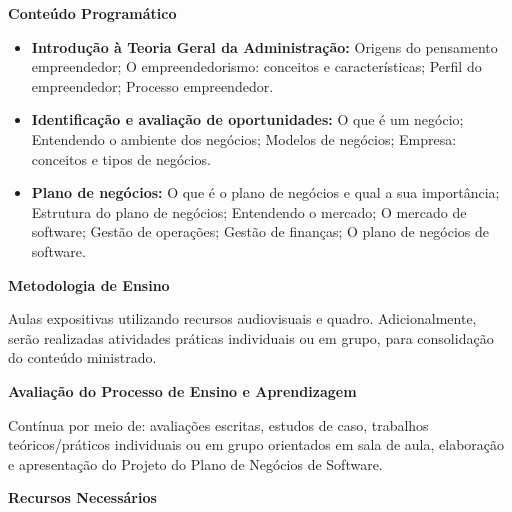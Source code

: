 
\begin{snugshade}\begin{center}\textbf{
    Conteúdo Programático
}\end{center}\end{snugshade}

\begin{itemize}

\item \textbf{Introdução à Teoria Geral da Administração:}
Origens do pensamento empreendedor; O empreendedorismo: conceitos e características; Perfil do empreendedor; Processo empreendedor.

\item \textbf{Identificação e avaliação de oportunidades:}
O que é um negócio; Entendendo o ambiente dos negócios; Modelos de negócios; Empresa: conceitos e tipos de negócios.

\item \textbf{Plano de negócios:} 
O que é o plano de negócios e qual a sua importância; Estrutura do plano de negócios; Entendendo o mercado; O mercado de software; Gestão de operações; Gestão de finanças; O plano de negócios de software.

\end{itemize}


\begin{snugshade}\begin{center}\textbf{
    Metodologia de Ensino
}\end{center}\end{snugshade}

\noindent
Aulas expositivas utilizando recursos audiovisuais e quadro. Adicionalmente, serão realizadas atividades práticas individuais ou em grupo, para consolidação do conteúdo ministrado.

\begin{snugshade}\begin{center}\textbf{
    Avaliação do Processo de Ensino e Aprendizagem
}\end{center}\end{snugshade}

\noindent
Contínua por meio de: avaliações escritas, estudos de caso, trabalhos teóricos/práticos individuais ou em grupo orientados em sala de aula, elaboração e apresentação do Projeto do Plano de Negócios de Software. 

\begin{snugshade}\begin{center}\textbf{
    Recursos Necessários
    \vphantom{q} %
}\end{center}\end{snugshade}

